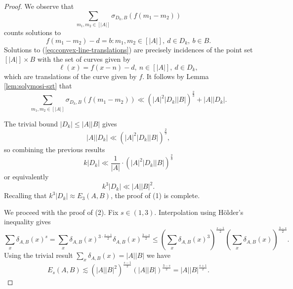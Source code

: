 \documentclass[reqno]{amsart}
\newcommand{\holder}{H\"older}
\numberwithin{equation}{section}
\begin{document}
\begin{proof}
We observe that
\[
    \sum _{ m_1,m_2 \in [\left\lvert A \right\rvert ]} \sigma_{D_{k} ,B} \left( f(m_1-m_2) \right)
\]
counts solutions to
\begin{equation} \label{eq:convex-line-translations}
    f(m_1 - m_2) - d = b : m_1,m_2 \in [\left\lvert A \right\rvert ],~ d \in D_{k} ,~ b \in B.
\end{equation}
Solutions to (\ref{eq:convex-line-translations}) are precisely incidences of the point set \([\left\lvert A \right\rvert ]\times B \) with the set
of curves given by
\[
    \ell (x) = f(x - n) - d ,~ n \in [\left\lvert A \right\rvert ] ,~ d \in D_{k} 
,\]
which are translations of the curve given by \(f\). It follows by Lemma \ref{lem:solymosi-szt}
that
\[
    \sum _{ m_1,m_2 \in [\left\lvert A \right\rvert ]} \sigma_{D_{k} ,B} \left( f(m_1-m_2) \right) \ll \left( \left\lvert A \right\rvert ^{2} \left\lvert D_{k}  \right\rvert \left\lvert B \right\rvert  \right) ^{\frac{2}{3} } + \left\lvert A \right\rvert \left\lvert D_{k}  \right\rvert 
.\]

The trivial bound \(\left\lvert D_{k}  \right\rvert \leq \left\lvert A \right\rvert \left\lvert B \right\rvert \) gives
\[
    \left\lvert A \right\rvert \left\lvert D_{k}  \right\rvert \ll \left( \left\lvert A \right\rvert ^{2}\left\lvert D_{k}  \right\rvert \left\lvert B \right\rvert  \right) ^{\frac{2}{3} }
,\]
so combining the previous results
\[
    k \left\lvert D_{k}  \right\rvert \ll \frac{1}{\left\lvert A \right\rvert } \cdot \left( \left\lvert A \right\rvert ^{2}\left\lvert D_{k}  \right\rvert \left\lvert B \right\rvert  \right) ^{\frac{2}{3} }
\]
or equivalently
\[
    k ^{3} \left\lvert D_{k}  \right\rvert \ll \left\lvert A \right\rvert \left\lvert B \right\rvert ^{2}
.\]
Recalling that \(k^{3} \left\lvert D_{k}  \right\rvert \approx E_3(A,B)\), the proof of (1) is complete.

We proceed with the proof of (2). Fix \(s \in (1,3)\). Interpolation using \holder's inequality gives
\[
    \sum _{x} \delta_{A,B} (x)^{s} = \sum _{x} \delta_{A,B} (x) ^{3 \cdot \frac{s-1}{2}  } \delta_{A,B} (x) ^{\frac{3- s }{2} } \leq \left( \sum _{x} \delta_{A,B} (x)^{3}  \right) ^{\frac{s-1}{2} } \left( \sum _{x} \delta_{A,B} (x) \right) ^{\frac{3-s}{2} }
.\]
Using the trivial result \( \sum _{x} \delta_{A,B} (x) = \left\lvert A \right\rvert \left\lvert B \right\rvert \) we have
\[
    E_{s} (A,B) \lesssim \left( \left\lvert A \right\rvert \left\lvert B \right\rvert ^{2} \right) ^{\frac{s-1}{2} } \left( \left\lvert A \right\rvert \left\lvert B \right\rvert  \right) ^{\frac{3 - s}{2} } = \left\lvert A \right\rvert \left\lvert B \right\rvert ^{\frac{s+1}{2} }
.\]
\end{proof}
\end{document}
